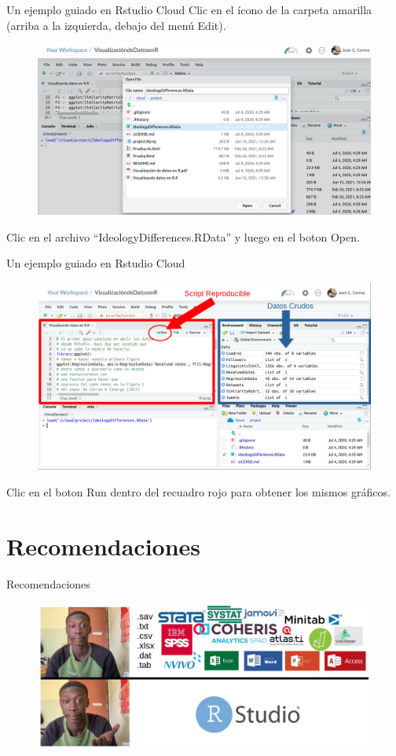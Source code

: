 \documentclass{beamer}
\begin{document}
\begin{frame}{Un ejemplo guiado en Rstudio Cloud}
Clic en el ícono de la carpeta amarilla (arriba a la izquierda, debajo del menú Edit).
\begin{figure}
\centering
\includegraphics[width=.7\textwidth]{AbrirDatos.png}
\end{figure}  
Clic en el archivo ``IdeologyDifferences.RData'' y luego en el boton Open.
\end{frame}

\begin{frame}{Un ejemplo guiado en Rstudio Cloud}
\begin{figure}
\centering
\includegraphics[width=1\textwidth]{Listo.png}
\end{figure}  
Clic en el boton Run dentro del recuadro rojo para obtener los mismos gráficos.
\end{frame}

\section{Recomendaciones}
\begin{frame}{Recomendaciones}
\begin{figure}
\centering
\includegraphics[width=.9\textwidth]{Simple.jpeg}
\end{figure}  
\end{frame}
\end{document}
